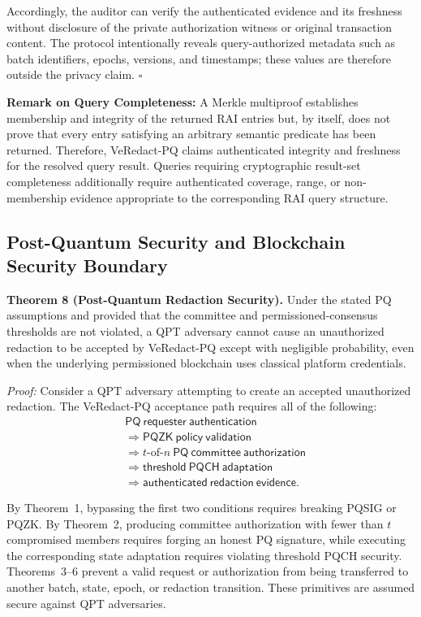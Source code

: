 \documentclass[lettersize,journal]{IEEEtran}
\begin{document}
Accordingly, the auditor can verify the authenticated evidence and
its freshness without disclosure of the private authorization witness
or original transaction content. The protocol intentionally reveals
query-authorized metadata such as batch identifiers, epochs, versions,
and timestamps; these values are therefore outside the privacy claim.
\hfill$\square$

\noindent\textbf{Remark on Query Completeness:}
A Merkle multiproof establishes membership and integrity of the
returned RAI entries but, by itself, does not prove that every entry
satisfying an arbitrary semantic predicate has been returned.
Therefore, VeRedact-PQ claims authenticated integrity and freshness
for the resolved query result. Queries requiring cryptographic
result-set completeness additionally require authenticated coverage,
range, or non-membership evidence appropriate to the corresponding
RAI query structure.


\subsection{Post-Quantum Security and Blockchain Security Boundary}

\textbf{Theorem 8 (Post-Quantum Redaction Security).}
Under the stated PQ assumptions and provided that the committee and
permissioned-consensus thresholds are not violated, a QPT adversary
cannot cause an unauthorized redaction to be accepted by
VeRedact-PQ except with negligible probability, even when the
underlying permissioned blockchain uses classical platform
credentials.

\emph{Proof:}
Consider a QPT adversary attempting to create an accepted unauthorized
redaction. The VeRedact-PQ acceptance path requires all of the
following:
\begin{equation}
\begin{split}
&\mathsf{PQ\ requester\ authentication}\\
&\Rightarrow
\mathsf{PQZK\ policy\ validation}\\
&\Rightarrow
t\text{-of-}n\ \mathsf{PQ\ committee\ authorization}\\
&\Rightarrow
\mathsf{threshold\ PQCH\ adaptation}\\
&\Rightarrow
\mathsf{authenticated\ redaction\ evidence}.
\end{split}
\label{eq:sec_pq_chain}
\end{equation}

By Theorem~1, bypassing the first two conditions requires breaking
PQSIG or PQZK. By Theorem~2, producing committee authorization with
fewer than $t$ compromised members requires forging an honest PQ
signature, while executing the corresponding state adaptation
requires violating threshold PQCH security. Theorems~3--6 prevent a
valid request or authorization from being transferred to another
batch, state, epoch, or redaction transition. These primitives are
assumed secure against QPT adversaries.
\end{document}
